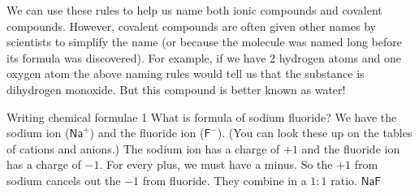 	\par
\label{m38708*eip-163}We can use these rules to help us name both ionic compounds and covalent compounds. However, covalent compounds are often given other names by scientists to simplify the name (or because the molecule was named long before its formula was discovered). For example, if we have 2 hydrogen atoms and one oxygen atom the above naming rules would tell us that the substance is dihydrogen monoxide. But this compound is better known as water!  \par \label{m38708*eip-254} \vspace{-1cm} 
      \begin{wex}{Writing chemical formulae 1}
{What is formula of sodium fluoride? 
\vspace{5pt}}
{
We have the sodium ion ($\mathsf{Na}^{+}$) and the fluoride ion ($\mathsf{F}^{-}$). (You can look these up on the tables of cations and anions.)
The sodium ion has a charge of $+1$ and the fluoride ion has a charge of $-1$.
For every plus, we must have a minus. So the $+1$ from sodium cancels out the $-1$ from fluoride. They combine in a $1:1$ ratio.
$\mathsf{NaF}$
}
\end{wex} \vspace{-2.5cm}
